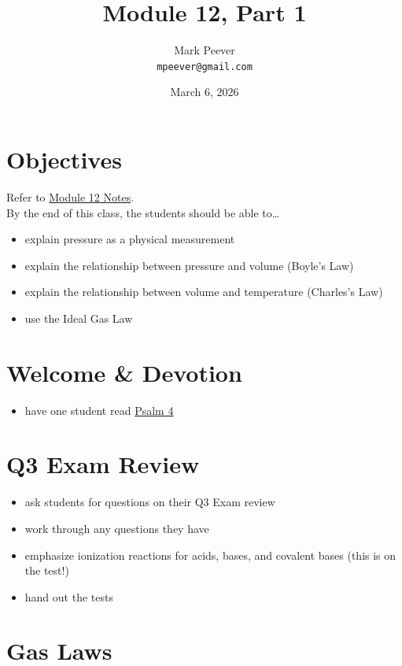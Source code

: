 \documentclass[10pt, oneside]{article}   	%
\title{Module 12, Part 1}
\author{Mark Peever\\ \texttt{mpeever@gmail.com}}
\date{March 6, 2026}
\begin{document}
\maketitle

\section*{Objectives}
Refer to \href{https://drive.google.com/file/d/1JpZKagO_RQ2Az20Uw2yLxLpzfNrq7TlN/view?usp=sharing}{Module 12 Notes}.\\

By the end of this class, the students should be able to\ldots
\begin{itemize}
\item explain pressure as a physical measurement
\item explain the relationship between pressure and volume (Boyle's Law)
\item explain the relationship between volume and temperature (Charles's Law)
\item use the Ideal Gas Law
\end{itemize}

\section*{Welcome \& Devotion}
\begin{itemize}
\item have one student read \href{https://www.biblegateway.com/passage/?search=Psalm\%204\&version=DARBY}{Psalm 4}
\end{itemize}

\section*{Q3 Exam Review}
\begin{itemize}
\item ask students for questions on their Q3 Exam review
\item work through any questions they have
\item emphasize ionization reactions for acids, bases, and covalent bases (this is on the test!)
\item hand out the tests
\end{itemize}

\section*{Gas Laws}
\end{document}
